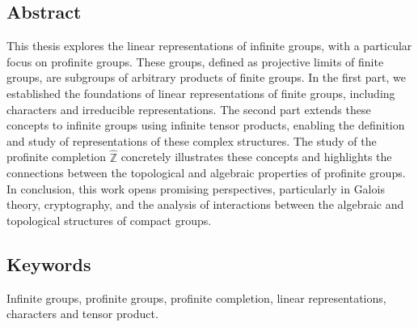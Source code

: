 \documentclass[a4paper, 14pt]{report}
\newcommand{\applyfontsize}{%
	\fontsize{12}{12}\selectfont
}
\begin{document}
\begin{onehalfspace}
\chapter*{Abstract}
{
	\applyfontsize %
This thesis explores the linear representations of infinite groups, with a particular focus on profinite groups. These groups, defined as projective limits of finite groups, are subgroups of arbitrary products of finite groups. In the first part, we established the foundations of linear representations of finite groups, including characters and irreducible representations. The second part extends these concepts to infinite groups using infinite tensor products, enabling the definition and study of representations of these complex structures. The study of the profinite completion \( \widehat{\mathbb{Z}} \)
concretely illustrates these concepts and highlights the connections between the topological and algebraic properties of profinite groups. In conclusion, this work opens promising perspectives, particularly in Galois theory, cryptography, and the analysis of interactions between the algebraic and topological structures of compact groups.



\section*{Keywords}
Infinite groups, profinite groups, profinite completion, linear representations, characters and tensor product.
	
}






\end{onehalfspace}
\end{document}
